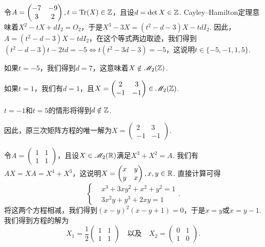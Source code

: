 \begin{solution}
  令$A=\begin{pmatrix}
    -7 & -9 \\
    3 & 2
  \end{pmatrix},t=\operatorname{Tr}(X)\in\mathbb Z$，且设$d=\det X\in\mathbb Z$. Cayley--Hamilton定理意味着$X^2-tX+dI_2=O_2$，于是$X^3-3X=(t^2-d-3)X-tdI_2$. 因此，$A=(t^2-d-3)X-tdI_2$，在这个等式两边取迹，我们得到$(t^2-d-3)t-2td=-5\Leftrightarrow t(t^2-3d-3)=-5$，这说明$t\in\{-5,-1,1,5\}$.

  如果$t=-5$，我们得到$d=7$，这意味着$X\notin \mathscr M_2(\mathbb Z)$.
  
  如果$t=1$，我们有$d=1$，且$X=\begin{pmatrix}
    2 & 3 \\
    -1 & -1
  \end{pmatrix}\in\mathscr M_2(\mathbb Z)$.

  $t=-1$和$t=5$的情形将得到$d\notin\mathbb Z$.

  因此，原三次矩阵方程的唯一解为$X=\begin{pmatrix}
    2 & 3 \\
    -1 & -1
  \end{pmatrix}$.
\end{solution}

\begin{solution}
  令$A=\begin{pmatrix}
    1 & 1 \\
    1 & 1
  \end{pmatrix}$，且设$X\in\mathscr M_2(\mathbb R)$满足$X^3+X^2=A$. 我们有$AX=XA=X^4+X^3$，这说明$X=\begin{pmatrix}
    x & y \\
    y & x
  \end{pmatrix},x,y\in\mathbb R$. 直接计算可得
  \[
    \left\{
      \begin{aligned}
        & x^3 + 3xy^2 + x^2 + y^2 = 1 \\
        & 3x^2y + y^3 + 2xy = 1
      \end{aligned}
    \right..
  \]
  将这两个方程相减，我们得到$(x-y)^2(x-y+1)=0$，于是$x=y$或$x=y-1$. 我们得到方程的解为
  \[
    X_1 = \frac12\begin{pmatrix}
      1 & 1 \\
      1 & 1
    \end{pmatrix}\quad \text{以及}\quad
    X_2 = \begin{pmatrix}
      0 & 1 \\
      1 & 0
    \end{pmatrix}.
  \]
\end{solution}

